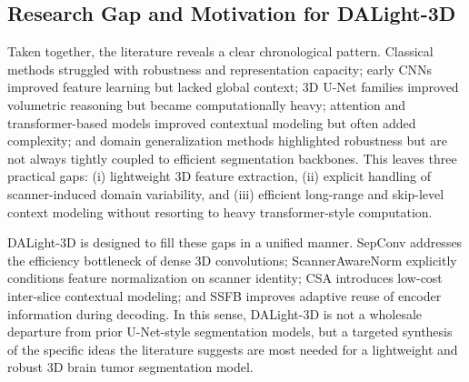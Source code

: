 \documentclass[conference]{IEEEtran}
\begin{document}
\subsection{Research Gap and Motivation for DALight-3D}

Taken together, the literature reveals a clear chronological pattern. Classical methods struggled with robustness and representation capacity; early CNNs improved feature learning but lacked global context; 3D U-Net families improved volumetric reasoning but became computationally heavy; attention and transformer-based models improved contextual modeling but often added complexity; and domain generalization methods highlighted robustness but are not always tightly coupled to efficient segmentation backbones. This leaves three practical gaps: (i) lightweight 3D feature extraction, (ii) explicit handling of scanner-induced domain variability, and (iii) efficient long-range and skip-level context modeling without resorting to heavy transformer-style computation.

DALight-3D is designed to fill these gaps in a unified manner. SepConv addresses the efficiency bottleneck of dense 3D convolutions; ScannerAwareNorm explicitly conditions feature normalization on scanner identity; CSA introduces low-cost inter-slice contextual modeling; and SSFB improves adaptive reuse of encoder information during decoding. In this sense, DALight-3D is not a wholesale departure from prior U-Net-style segmentation models, but a targeted synthesis of the specific ideas the literature suggests are most needed for a lightweight and robust 3D brain tumor segmentation model.
\end{document}
